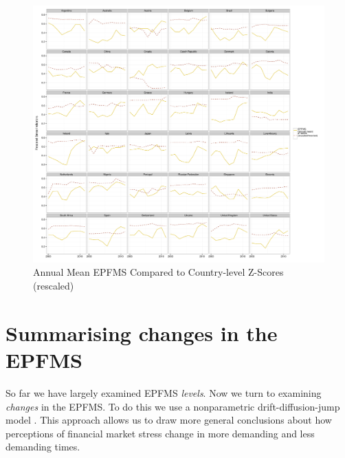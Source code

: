 \documentclass[]{article}
\begin{document}
\begin{figure}

    \caption{Annual Mean EPFMS Compared to Country-level Z-Scores (rescaled)}
    \label{z_score}

    \begin{center}
        \includegraphics[scale=0.4]{analysis/figures/compare_to_z-score.pdf}
    \end{center}

\end{figure}

\section{Summarising changes in the EPFMS}

So far we have largely examined EPFMS \emph{levels}. Now we turn to examining \emph{changes} in the EPFMS. To do this we use a nonparametric drift-diffusion-jump model \citep[DDJ,][]{Carpenter2011,Dakos2012}. This approach allows us to draw more general conclusions about how perceptions of financial market stress change in more demanding and less demanding times.
\end{document}
